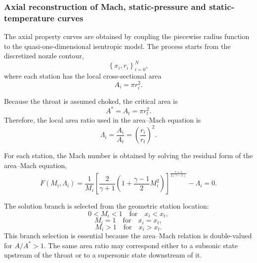 \documentclass[11pt,a4paper]{article}
\begin{document}
\subsubsection{Axial reconstruction of Mach, static-pressure and static-temperature curves}

The axial property curves are obtained by coupling the piecewise radius function to the quasi-one-dimensional isentropic model. The process starts from the discretized nozzle contour,
\begin{equation}
\left\{x_i,r_i\right\}_{i=0}^{N},
\end{equation}
where each station has the local cross-sectional area
\begin{equation}
A_i=\pi r_i^2.
\label{eq:local_area_discrete}
\end{equation}

Because the throat is assumed choked, the critical area is
\begin{equation}
A^*=A_t=\pi r_t^2.
\end{equation}
Therefore, the local area ratio used in the area--Mach equation is
\begin{equation}
\Lambda_i=\frac{A_i}{A_t}=\left(\frac{r_i}{r_t}\right)^2.
\label{eq:local_area_ratio_discrete}
\end{equation}

For each station, the Mach number is obtained by solving the residual form of the area--Mach equation,
\begin{equation}
F(M_i,\Lambda_i)=
\frac{1}{M_i}
\left[
\frac{2}{\gamma+1}
\left(1+\frac{\gamma-1}{2}M_i^2\right)
\right]^{\frac{\gamma+1}{2(\gamma-1)}}
-\Lambda_i=0.
\label{eq:mach_curve_residual}
\end{equation}

The solution branch is selected from the geometric station location:
\begin{equation}
0<M_i<1 \quad \text{for} \quad x_i<x_t,
\end{equation}
\begin{equation}
M_i=1 \quad \text{for} \quad x_i=x_t,
\end{equation}
\begin{equation}
M_i>1 \quad \text{for} \quad x_i>x_t.
\end{equation}
This branch selection is essential because the area--Mach relation is double-valued for \(A/A^*>1\). The same area ratio may correspond either to a subsonic state upstream of the throat or to a supersonic state downstream of it.
\end{document}
